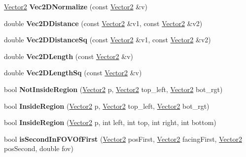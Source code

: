 \begin{DoxyCompactItemize}
\item 
\hypertarget{namespacesteer_a2c2897e317d7cec95885fecace5e6721}{\hyperlink{structsteer_1_1_vector2}{Vector2} {\bfseries Vec2\-D\-Normalize} (const \hyperlink{structsteer_1_1_vector2}{Vector2} \&v)}\label{namespacesteer_a2c2897e317d7cec95885fecace5e6721}

\item 
\hypertarget{namespacesteer_a20ffa1dbeba5350c659fd4b633d71fc7}{double {\bfseries Vec2\-D\-Distance} (const \hyperlink{structsteer_1_1_vector2}{Vector2} \&v1, const \hyperlink{structsteer_1_1_vector2}{Vector2} \&v2)}\label{namespacesteer_a20ffa1dbeba5350c659fd4b633d71fc7}

\item 
\hypertarget{namespacesteer_ae90ccef2b4abb712d998e2dce06f7ac3}{double {\bfseries Vec2\-D\-Distance\-Sq} (const \hyperlink{structsteer_1_1_vector2}{Vector2} \&v1, const \hyperlink{structsteer_1_1_vector2}{Vector2} \&v2)}\label{namespacesteer_ae90ccef2b4abb712d998e2dce06f7ac3}

\item 
\hypertarget{namespacesteer_a40eb10235c17dfd4cc99365a2eea239b}{double {\bfseries Vec2\-D\-Length} (const \hyperlink{structsteer_1_1_vector2}{Vector2} \&v)}\label{namespacesteer_a40eb10235c17dfd4cc99365a2eea239b}

\item 
\hypertarget{namespacesteer_a09905f2e9bf6e2ddf87db9351bfb7f1e}{double {\bfseries Vec2\-D\-Length\-Sq} (const \hyperlink{structsteer_1_1_vector2}{Vector2} \&v)}\label{namespacesteer_a09905f2e9bf6e2ddf87db9351bfb7f1e}

\item 
\hypertarget{namespacesteer_ae65ad10b8625684daa28ee9a77a7d6ea}{bool {\bfseries Not\-Inside\-Region} (\hyperlink{structsteer_1_1_vector2}{Vector2} p, \hyperlink{structsteer_1_1_vector2}{Vector2} top\-\_\-left, \hyperlink{structsteer_1_1_vector2}{Vector2} bot\-\_\-rgt)}\label{namespacesteer_ae65ad10b8625684daa28ee9a77a7d6ea}

\item 
\hypertarget{namespacesteer_af39e0810dd737d7105e7cd34945a6b14}{bool {\bfseries Inside\-Region} (\hyperlink{structsteer_1_1_vector2}{Vector2} p, \hyperlink{structsteer_1_1_vector2}{Vector2} top\-\_\-left, \hyperlink{structsteer_1_1_vector2}{Vector2} bot\-\_\-rgt)}\label{namespacesteer_af39e0810dd737d7105e7cd34945a6b14}

\item 
\hypertarget{namespacesteer_a89da8595b52ce4ebbfce76b79b14d691}{bool {\bfseries Inside\-Region} (\hyperlink{structsteer_1_1_vector2}{Vector2} p, int left, int top, int right, int bottom)}\label{namespacesteer_a89da8595b52ce4ebbfce76b79b14d691}

\item 
\hypertarget{namespacesteer_ae71a54989ea2d8d78c474d48cfbb2719}{bool {\bfseries is\-Second\-In\-F\-O\-V\-Of\-First} (\hyperlink{structsteer_1_1_vector2}{Vector2} pos\-First, \hyperlink{structsteer_1_1_vector2}{Vector2} facing\-First, \hyperlink{structsteer_1_1_vector2}{Vector2} pos\-Second, double fov)}\label{namespacesteer_ae71a54989ea2d8d78c474d48cfbb2719}

\end{DoxyCompactItemize}
